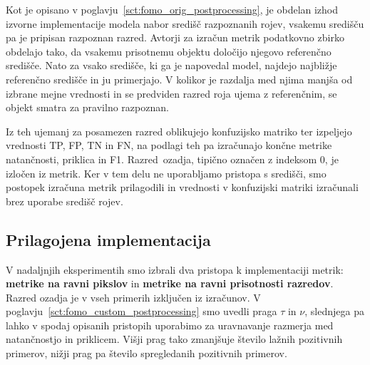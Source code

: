 \documentclass[a4paper,twoside,openright,12pt,slovene]{book}
\begin{document}
            Kot je opisano v
            poglavju~\ref{sct:fomo_orig_postprocessing},
            je obdelan izhod izvorne implementacije modela nabor središč
            razpoznanih rojev, vsakemu središču pa je pripisan razpoznan
            razred. Avtorji za izračun metrik podatkovno zbirko obdelajo tako,
            da vsakemu prisotnemu objektu določijo njegovo referenčno središče.
            Nato za vsako središče, ki ga je napovedal model, najdejo najbližje
            referenčno središče in ju primerjajo. V kolikor je razdalja med
            njima manjša od izbrane mejne vrednosti in se predviden razred roja
            ujema z referenčnim, se objekt smatra za pravilno razpoznan.

            Iz teh ujemanj za posamezen razred oblikujejo konfuzijsko matriko
            ter izpeljejo vrednosti TP, FP, TN in FN, na podlagi teh pa
            izračunajo končne metrike natančnosti, priklica in F1. \mbox{Razred
            ozadja}, tipično označen z indeksom 0, je izločen iz metrik. Ker v
            tem delu ne uporabljamo pristopa s središči, smo postopek izračuna
            metrik prilagodili in vrednosti v konfuzijski matriki izračunali
            brez uporabe središč rojev.

        \subsection{Prilagojena implementacija} \label{sct:eir-metrike-prilagojena}

            V nadaljnjih eksperimentih smo izbrali dva pristopa k implementaciji
            metrik: \textbf{metrike na ravni pikslov} in \textbf{metrike na
            ravni prisotnosti razredov}. Razred ozadja je v vseh primerih
            izključen iz izračunov. V
            poglavju~\ref{sct:fomo_custom_postprocessing}
            smo uvedli praga $\tau$ in $\nu$, slednjega pa lahko v spodaj opisanih pristopih uporabimo za
            uravnavanje razmerja med natančnostjo in priklicem. Višji prag tako
            zmanjšuje število lažnih pozitivnih primerov, nižji prag pa število
            spregledanih pozitivnih primerov.
\end{document}
